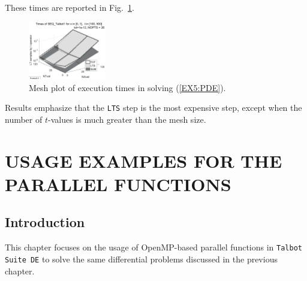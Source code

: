 \documentclass[a4paper,10pt]{report}%
\begin{document}
These times are reported in Fig.~\ref{EX5_times3D_tol4}.
\begin{figure}[ht]
\centering
\includegraphics[width=0.3\textwidth]{./FIGS/EX5/EX5_times3D_tol4_3.eps}
\caption{\small Mesh plot of execution times in solving (\ref{EX5:PDE}).}
\label{EX5_times3D_tol4}
\end{figure}

\noindent Results emphasize that the {\tt LTS} step is the most expensive step, except when the number of
$t$-values is much greater than the mesh size.



\chapter{USAGE EXAMPLES FOR THE PARALLEL FUNCTIONS}


\section{Introduction}
This chapter focuses on the usage of OpenMP-based parallel functions in {\tt Talbot Suite DE} to solve
the same differential problems discussed in the previous chapter.
\end{document}
